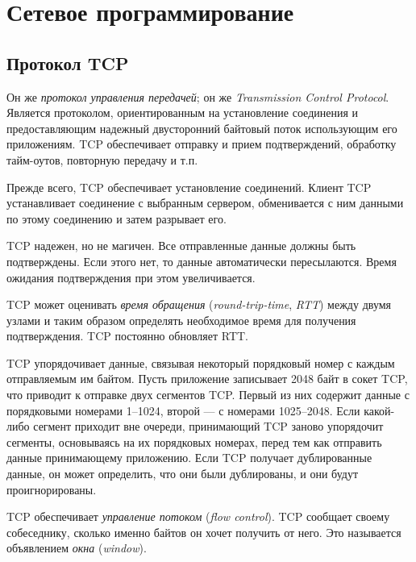 \chapter{Сетевое программирование}
\label{ch:network}

\section{Протокол TCP}
\label{sec:tcp}
Он же \emph{протокол управления передачей}; он же \emph{Transmission Control Protocol}. Является протоколом, ориентированным на установление соединения и предоставляющим надежный двусторонний байтовый поток использующим его приложениям. TCP обеспечивает отправку и прием подтверждений, обработку тайм-оутов, повторную передачу и т.п.

Прежде всего, TCP обеспечивает установление соединений. Клиент TCP устанавливает соединение с выбранным сервером, обменивается с ним данными по этому соединению и затем разрывает его.

TCP надежен, но не магичен. Все отправленные данные должны быть подтверждены. Если этого нет, то данные автоматически пересылаются. Время ожидания подтверждения при этом увеличивается.

TCP может оценивать \emph{время обращения} (\emph{round-trip-time}, \emph{RTT}) между двумя узлами и таким образом определять необходимое время для получения подтверждения. TCP постоянно обновляет RTT.

TCP упорядочивает данные, связывая некоторый порядковый номер с каждым отправляемым им байтом. Пусть приложение записывает 2048 байт в сокет TCP, что приводит к отправке двух сегментов TCP. Первый из них содержит данные с порядковыми номерами 1--1024, второй --- с номерами 1025--2048. Если какой-либо сегмент приходит вне очереди, принимающий TCP заново упорядочит сегменты, основываясь на их порядковых номерах, перед тем как отправить данные принимающему приложению. Если TCP получает дублированные данные, он может определить, что они были дублированы, и они будут проигнорированы.

TCP обеспечивает \emph{управление потоком} (\emph{flow control}). TCP сообщает своему собеседнику, сколько именно байтов он хочет получить от него. Это называется объявлением \emph{окна} (\emph{window}).

